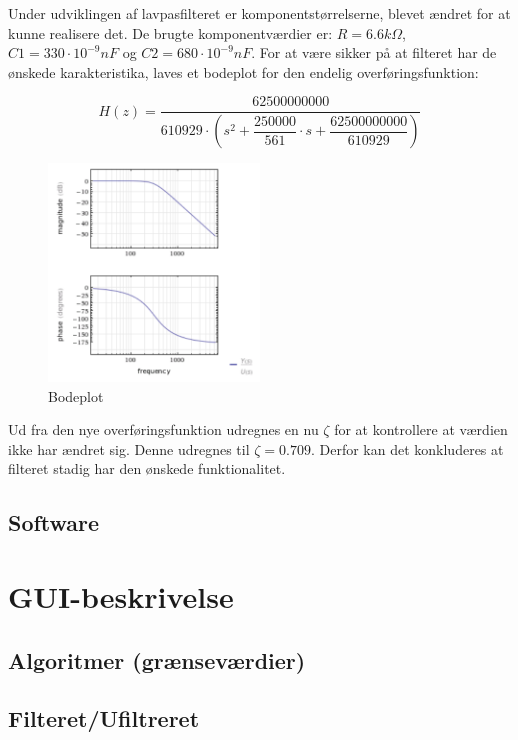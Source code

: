 Under udviklingen af lavpasfilteret er komponentstørrelserne, blevet ændret for at kunne realisere det. De brugte komponentværdier er: $ R= 6.6 k\Omega $, $ C1= 330\cdot 10 ^{-9} nF$ og $ C2= 680\cdot 10^{-9} nF$.   
For at være sikker på at filteret har de ønskede karakteristika, laves et bodeplot for den endelig overføringsfunktion: 
\begin{ceqn}
\begin{equation}
H(z)=\dfrac{62500000000}{610929\cdot \left( s^2+\dfrac{250000}{561}\cdot s + \dfrac{62500000000}{610929} \right)}
\end{equation}
\end{ceqn}
\begin{figure}[H]
	\centering
	\includegraphics[width=0.5\textwidth]{Figurer/Bodeplot}
	\caption{Bodeplot}
	\label{fig:bodeplot}
\end{figure}
Ud fra den nye overføringsfunktion udregnes en nu $ \zeta $ for at kontrollere at værdien ikke har ændret sig. Denne udregnes til $ \zeta = 0.709 $. Derfor kan det konkluderes at filteret stadig har den ønskede funktionalitet. 

\subsection{Software}

\section{GUI-beskrivelse}
\subsection{Algoritmer (grænseværdier)}
\subsection{Filteret/Ufiltreret}

